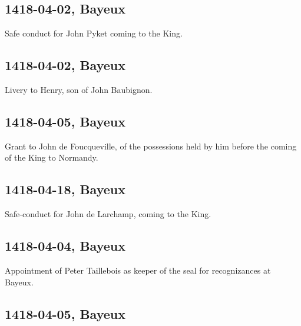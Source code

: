 \documentclass[a4paper,12pt,twoside]{book}
\begin{document}
                
                \subsection{1418-04-02, Bayeux}
                
                
                  Safe conduct for John Pyket coming to the King.
               
                
                \subsection{1418-04-02, Bayeux}
                
                
                  Livery to Henry, son of John Baubignon.
               
                
                \subsection{1418-04-05, Bayeux}
                
                
                  Grant to John de Foucqueville, of the possessions held by him before the coming of the King to Normandy.
               
                
                \subsection{1418-04-18, Bayeux}
                
                
                  Safe-conduct for John de Larchamp, coming to the King.
               
                
                \subsection{1418-04-04, Bayeux}
                
                
                  Appointment of Peter Taillebois as keeper of the seal for recognizances at Bayeux.
               
                
                \subsection{1418-04-05, Bayeux}
                
\end{document}
